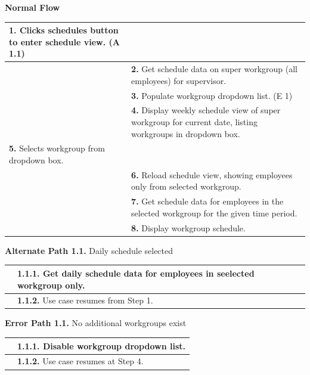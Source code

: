 \documentclass[letterpaper,12pt]{report}
\begin{document}
{ \centering \textbf{Normal Flow}
\begin{center}
\xuchead
\begin{tabular}{| p{8.5cm} | p{8.5cm} |}
\hline
\textbf{1.} Clicks schedules button to enter schedule view. (A 1.1) & \\
\hline
& \textbf{2.} Get schedule data on super workgroup (all employees) for supervisor. \\
\hline
& \textbf{3.} Populate workgroup dropdown list. (E 1) \\
\hline
& \textbf{4.} Display weekly schedule view of super workgroup for current date, listing workgroups in dropdown box. \\
\hline
\textbf{5.} Selects workgroup from dropdown box. & \\
\hline
& \textbf{6.} Reload schedule view, showing employees only from selected workgroup. \\
\hline
& \textbf{7.} Get schedule data for employees in the selected workgroup for the given time period. \\
\hline
& \textbf{8.} Display workgroup schedule. \\
\hline
\end{tabular}
\end{center}

\centering \textbf{Alternate Path 1.1.}
\linebreak Daily schedule selected
\begin{center}
\xuchead
\begin{tabular}{| p{8.5cm} | p{8.5cm} |}
\hline
& \textbf{1.1.1.} Get daily schedule data for employees in seelected workgroup only. \\
\hline
& \textbf{1.1.2.} Use case\index{Use Case} resumes from Step 1. \\
\hline
\end{tabular}
\end{center}
\pagebreak
\centering \textbf{Error Path 1.1.}
\linebreak No additional workgroups exist
\begin{center}
\xuchead
\begin{tabular}{| p{8.5cm} | p{8.5cm} |}
\hline
& \textbf{1.1.1.} Disable workgroup dropdown list. \\
\hline
& \textbf{1.1.2.} Use case\index{Use Case} resumes at Step 4. \\
\hline
\end{tabular}
\end{center}

}
\end{document}

